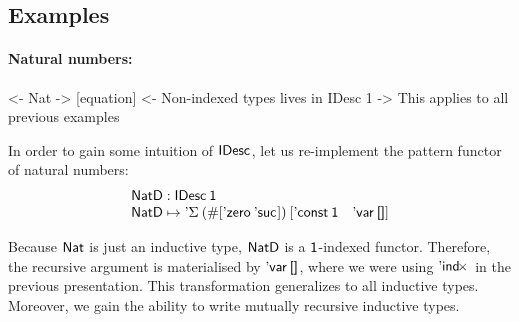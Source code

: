 %
%
%


\subsection{Examples}
\label{sec:idesc-examples}

\paragraph{Natural numbers:}

\begin{wstructure}
<- Nat
    -> [equation]
    <- Non-indexed types lives in IDesc 1
        -> This applies to all previous examples
\end{wstructure}

In order to gain some intuition of $\IDesc{\!}$, let us re-implement
the pattern functor of natural numbers:
%
\[\stk{
\NatD : \IDesc{\Unit} \\
\NatD \mapsto \DSigma{(\EnumT{[ \NatZero\: \NatSuc{\!} ]})}
                     {\red{[} \DConst{\Unit} \quad \DVar{\Void} \red{]}}
}\]

Because $\Nat$ is just an inductive type, $\NatD$ is a $\Unit$-indexed
functor. Therefore, the recursive argument is materialised by
$\DVar{\Void}$, where we were using $\DIndx{\!}$ in the previous
presentation. This transformation generalizes to all inductive
types. Moreover, we gain the ability to write mutually recursive
inductive types.



